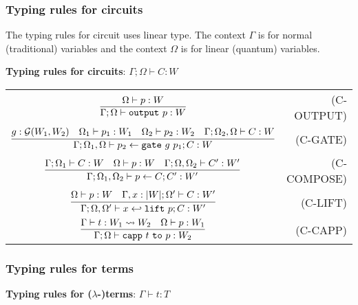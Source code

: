 \subsubsection{Typing rules for circuits}
The typing rules for circuit uses linear type. The context $\Gamma$ is for normal (traditional) variables and the context $\Omega$ is for linear (quantum) variables.

\noindent \textbf{Typing rules for circuits}: $\boxed{\Gamma;\Omega\vdash C:W}$


\renewcommand\arraystretch{3} 
\begin{longtable}[c]{cr}
  $\infer{\Gamma;\Omega\vdash \toutput\ p:W}{\Omega\vdash p : W}$ &(C-OUTPUT)\\
  $\infer{\Gamma;\Omega_1,\Omega\vdash p_2 \from \gate\ g\ p_1 ; C:W}{g:\calG(W_1, W_2) &\Omega_1\vdash p_1:W_1 &\Omega_2\vdash p_2:W_2 &\Gamma ; \Omega_2,\Omega \vdash C:W}$ &(C-GATE)\\
  $\infer{\Gamma;\Omega_1,\Omega_2\vdash p \from C ; C':W'}{\Gamma;\Omega_1\vdash C:W &\Omega \vdash p:W &\Gamma;\Omega,\Omega_2 \vdash C':W'}$ &(C-COMPOSE)\\
  $\infer{\Gamma;\Omega,\Omega'\vdash x \hookleftarrow \lift\ p ; C:W'}{\Omega\vdash p:W &\Gamma,x:|W|;\Omega' \vdash C:W'}$ &(C-LIFT)\\
  $\infer{\Gamma;\Omega\vdash \capp\ t\ \mathtt{to}\ p : W_2}{\Gamma\vdash t:W_1\leadsto W_2 &\Omega\vdash p:W_1}$ &(C-CAPP)\\
  
\end{longtable}

\subsubsection{Typing rules for terms}

\noindent \textbf{Typing rules for ($\lambda$-)terms}: $\boxed{\Gamma\vdash t:T}$

